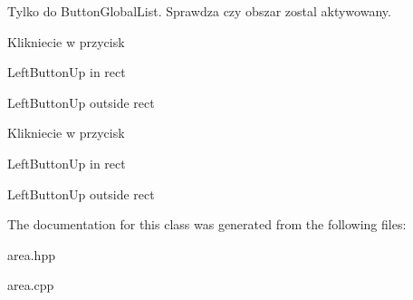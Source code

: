 Tylko do Button\+Global\+List. Sprawdza czy obszar zostal aktywowany. 

Klikniecie w przycisk

Left\+Button\+Up in rect

Left\+Button\+Up outside rect

Klikniecie w przycisk

Left\+Button\+Up in rect

Left\+Button\+Up outside rect 

The documentation for this class was generated from the following files\+:\begin{DoxyCompactItemize}
\item 
area.\+hpp\item 
area.\+cpp\end{DoxyCompactItemize}
